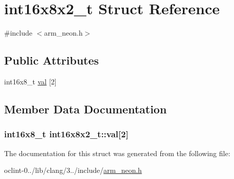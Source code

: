 \hypertarget{structint16x8x2__t}{\section{int16x8x2\-\_\-t Struct Reference}
\label{structint16x8x2__t}
}


{\ttfamily \#include $<$arm\-\_\-neon.\-h$>$}

\subsection*{Public Attributes}
\begin{DoxyCompactItemize}
\item 
int16x8\-\_\-t \hyperlink{structint16x8x2__t_a4ee5fbe2d6314afb498a56c62c7663a1}{val} \mbox{[}2\mbox{]}
\end{DoxyCompactItemize}


\subsection{Member Data Documentation}
\hypertarget{structint16x8x2__t_a4ee5fbe2d6314afb498a56c62c7663a1}{
\subsubsection[{val}]{\setlength{\rightskip}{0pt plus 5cm}int16x8\-\_\-t int16x8x2\-\_\-t\-::val\mbox{[}2\mbox{]}}}\label{structint16x8x2__t_a4ee5fbe2d6314afb498a56c62c7663a1}


The documentation for this struct was generated from the following file\-:\begin{DoxyCompactItemize}
\item 
oclint-\/0../lib/clang/3../include/\hyperlink{arm__neon_8h}{arm\-\_\-neon.\-h}\end{DoxyCompactItemize}
